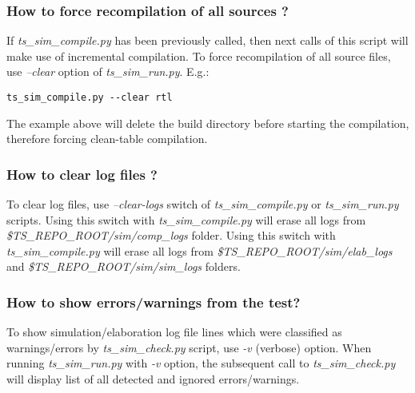 \documentclass{tropic_design_spec}
\begin{document}
\subsubsection{How to force recompilation of all sources ?}
\label{sec:how-to-force-recompilation-of-all-sources?}

If \textit{ts_sim_compile.py} has been previously called, then next calls of this script
will make use of incremental compilation. To force recompilation of all source files,
use \textit{--clear} option of \textit{ts_sim_run.py}. E.g.:

\begin{lstlisting}
ts_sim_compile.py --clear rtl
\end{lstlisting}

The example above will delete the build directory before starting the compilation, 
therefore forcing clean-table compilation.


\subsubsection{How to clear log files ?}
\label{sec:how-to-clear-log-files}

To clear log files, use \textit{--clear-logs} switch of \textit{ts_sim_compile.py} or
\textit{ts_sim_run.py} scripts. Using this switch with \textit{ts_sim_compile.py} will
erase all logs from \textit{\$TS_REPO_ROOT/sim/comp_logs} folder. Using this switch with
\textit{ts_sim_compile.py} will erase all logs from \textit{\$TS_REPO_ROOT/sim/elab_logs} 
and \textit{\$TS_REPO_ROOT/sim/sim_logs} folders.


\subsubsection{How to show errors/warnings from the test?}
\label{sec:how-to-show-errors-warningsf-from-the-test}

To show simulation/elaboration log file lines which were classified as warnings/errors by
\textit{ts_sim_check.py} script, use \textit{-v} (verbose) option. When running
\textit{ts_sim_run.py} with \textit{-v} option, the subsequent call to
\textit{ts_sim_check.py} will display list of all detected and ignored errors/warnings.
\end{document}
